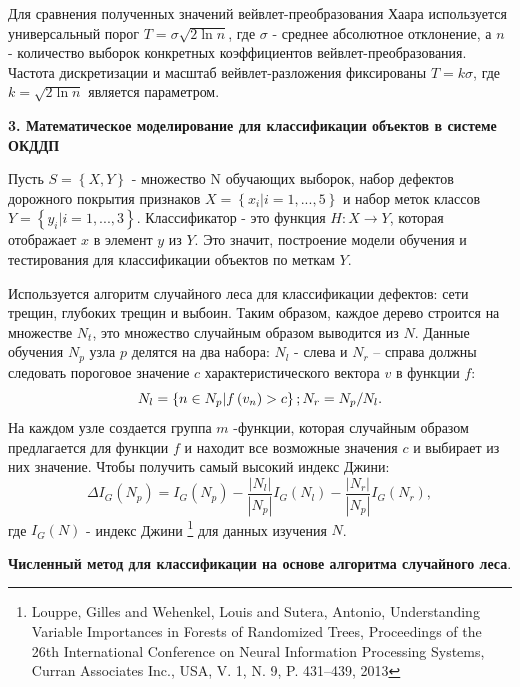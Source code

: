 Для сравнения полученных значений вейвлет-преобразования Хаара используется универсальный порог $ T = \sigma \sqrt {2 \ln n} $, где $ \sigma $ - среднее абсолютное отклонение, а $ n $ - количество выборок конкретных коэффициентов вейвлет-преобразования. Частота дискретизации и масштаб вейвлет-разложения фиксированы $ T = k \sigma $, где $ k = \sqrt {2 \ln n} $ является параметром.

\textbf{3. Математическое моделирование для классификации объектов в системе ОКДДП}

Пусть $S=\left\{X, Y\right\}$ - множество N обучающих выборок, набор дефектов дорожного покрытия признаков $X=\left\{x_i | i = 1, ..., 5\right\}$ и набор меток классов $Y = \left\{y_i |i = 1, ..., 3\right\}$. Классификатор - это функция $H: X \rightarrow Y$, которая отображает $x$ в элемент $y$ из $Y$. Это значит, построение модели обучения и тестирования для классификации объектов по меткам $Y$.

Используется алгоритм случайного леса для классификации дефектов: сети трещин, глубоких трещин и выбоин. Таким образом, каждое дерево строится на множестве $N_t$, это множество случайным образом выводится из $N$. Данные обучения $N_p$ узла $p$ делятся на два набора: $N_l$ - слева и $N_r$ – справа должны следовать пороговое значение $c$ характеристического вектора $v$ в функции $f$:
\begin{equation}\label{eq11}
N_l = \left\{n \in N_p | f\left(v_n\right) > c\right\};  \\
N_r=N_p / N_l.
\end{equation}
На каждом узле создается группа $ m $ -функции, которая случайным образом предлагается для функции $ f $ и находит все возможные значения $ c $ и выбирает из них значение. Чтобы получить самый высокий индекс Джини:
\begin{equation}\label{eq12}
\Delta I_G\left(N_p\right)=I_G\left(N_p\right) - \frac{|N_l|}{|N_p|}I_G\left(N_l\right) - \frac{|N_r|}{|N_p|}I_G\left(N_r\right),
\end{equation} где $I_G\left(N\right)$ - индекс Джини \footnote {Louppe, Gilles and Wehenkel, Louis and Sutera, Antonio, Understanding Variable Importances in Forests of Randomized Trees, Proceedings of the 26th International Conference on Neural Information Processing Systems, Curran Associates Inc., USA, V. 1, N. 9, P. 431--439, 2013} для данных изучения $N$.

\newpage \textbf{Численный метод для классификации на основе алгоритма случайного леса}.

